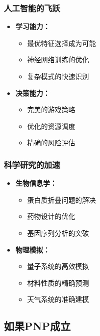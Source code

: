 \documentclass[a4paper,12pt]{ctexart}
\begin{document}
\subsubsection{人工智能的飞跃}
\begin{itemize}
    \item \textbf{学习能力：}
        \begin{itemize}
            \item 最优特征选择成为可能
            \item 神经网络训练的优化
            \item 复杂模式的快速识别
        \end{itemize}
    \item \textbf{决策能力：}
        \begin{itemize}
            \item 完美的游戏策略
            \item 优化的资源调度
            \item 精确的风险评估
        \end{itemize}
\end{itemize}

\subsubsection{科学研究的加速}
\begin{itemize}
    \item \textbf{生物信息学：}
        \begin{itemize}
            \item 蛋白质折叠问题的解决
            \item 药物设计的优化
            \item 基因序列分析的突破
        \end{itemize}
    \item \textbf{物理模拟：}
        \begin{itemize}
            \item 量子系统的高效模拟
            \item 材料性质的精确预测
            \item 天气系统的准确建模
        \end{itemize}
\end{itemize}

\subsection{如果P\neq NP成立}
\end{document}
